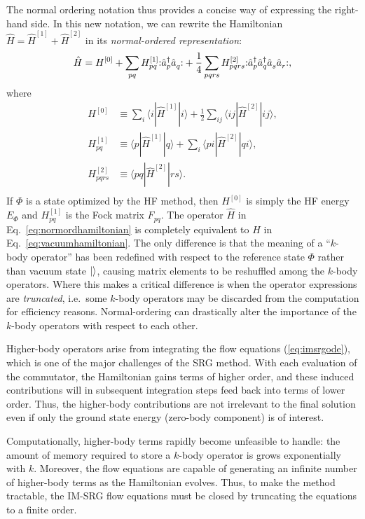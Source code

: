 The normal ordering notation thus provides a concise way of expressing the right-hand side.  In this new notation, we can rewrite the Hamiltonian $\hat H = \hat{H}^{[1]} + \hat{H}^{[2]}$ in its \emph{normal-ordered representation}:
\begin{align}
  \hat{H} = H^{[0]} + \sum_{p q} H^{[1]}_{p q} \mathopen: \hat{a}_p^\dagger \hat{a}_q^{} \mathclose: + \frac{1}{4} \sum_{p q r s} H^{[2]}_{p q r s} \mathopen: \hat{a}_p^\dagger \hat{a}_q^\dagger \hat{a}_s^{} \hat{a}_r^{} \mathclose:,
  \label{eq:normordhamiltonian}
\end{align}
where
\begin{align*}
  H^{[0]} &\equiv \sum_i \langle i | \hat{H}^{[1]} | i \rangle + \frac{1}{2} \sum_{i j} \langle i j | \hat{H}^{[2]} | i j \rangle, \\
  H^{[1]}_{p q} &\equiv \langle p | \hat{H}^{[1]} | q \rangle + \sum_i \langle p i | \hat{H}^{[2]} | q i \rangle, \\
  H^{[2]}_{p q r s} &\equiv \langle p q | \hat{H}^{[2]} | r s \rangle. \\
\end{align*}
If $\Phi$ is a state optimized by the HF method, then $H^{[0]}$ is simply the HF energy $E_\Phi$ and $H^{[1]}_{p q}$ is the Fock matrix $F_{p q}$.  The operator $\hat H$ in Eq.\ \eqref{eq:normordhamiltonian} is completely equivalent to $\hat H$ in Eq.\ \eqref{eq:vacuumhamiltonian}.  The only difference is that the meaning of a ``$k$-body operator'' has been redefined with respect to the reference state $\Phi$ rather than vacuum state $|  \rangle$, causing matrix elements to be reshuffled among the $k$-body operators.  Where this makes a critical difference is when the operator expressions are \emph{truncated}, i.e.\ some $k$-body operators may be discarded from the computation for efficiency reasons.  Normal-ordering can drastically alter the importance of the $k$-body operators with respect to each other.

Higher-body operators arise from integrating the flow equations (\ref{eq:imsrgode}), which is one of the major challenges of the SRG method.  With each evaluation of the commutator, the Hamiltonian gains terms of higher order, and these induced contributions will in subsequent integration steps feed back into terms of lower order.  Thus, the higher-body contributions are not irrelevant to the final solution even if only the ground state energy (zero-body component) is of interest.

Computationally, higher-body terms rapidly become unfeasible to handle: the amount of memory required to store a $k$-body operator is grows exponentially with $k$.  Moreover, the flow equations are capable of generating an infinite number of higher-body terms as the Hamiltonian evolves.  Thus, to make the method tractable, the IM-SRG flow equations must be closed by truncating the equations to a finite order.

